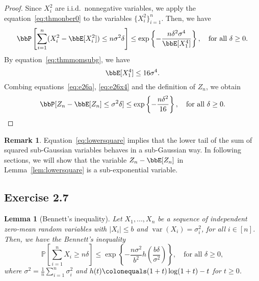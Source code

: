 \documentclass[11pt]{article}
\DeclareMathOperator{\var}{var}
\theoremstyle{plain}
\newtheorem{lem}{Lemma}
\theoremstyle{definition}
\newtheorem{rmk}{Remark}
\begin{document}
\begin{proof}
	Since $X_i^2$ are i.i.d.\ nonnegative variables, we apply the equation~\eqref{eq:thmonber0} to the variables $\{X_i^2\}_{i=1}^n$. Then, we have
	\begin{equation}\label{eq:e26a}
		\bbP\left[\sum_{i=1}^n (X_i^2 -\bbE[X_i^2]) \leq n \sigma^2 \delta\right] \leq \exp\left\{ - \frac{n\delta^2 \sigma^4}{ \bbE[X_1^4]} \right\},  \quad \text{for all }\delta \geq 0.
	\end{equation}
	By equation~\eqref{eq:thmmomsubg}, we have
	\begin{equation}\label{eq:e26x4}
		\bbE[X_1^4] \leq 16 \sigma^4. 
	\end{equation}
	Combing equations~\eqref{eq:e26a}, \eqref{eq:e26x4} and the definition of $Z_n$, we obtain 
	\begin{equation}
		\bbP[Z_n - \bbE[Z_n] \leq \sigma^2 \delta ]  \leq \exp\left\{ - \frac{n\delta^2}{16} \right\},  \quad \text{for all }\delta \geq 0.
	\end{equation}
\end{proof}

\begin{rmk}
	Equation~\eqref{eq:lowersquare} implies that the lower tail of the sum of squared sub-Gaussian variables behaves in a sub-Gaussian way. In following sections, we will show that the variable $Z_n - \bbE[Z_n]$ in Lemma~\ref{lem:lowersquare} is a sub-exponential variable.
\end{rmk}

\subsection{Exercise 2.7}
\begin{lem}[Bennett’s inequality]\label{lem:bennett}
	Let $X_1,...,X_n$ be a sequence of independent zero-mean random variables with $|X_i| \leq b$ and $\var(X_i) = \sigma_i^2$, for all $i \in [n]$. Then, we have the Bennett's inequality
	\begin{equation}\label{eq:bennett}
		\mathbb{P}\left[\sum_{i=1}^{n} X_{i} \geq n \delta\right] \leq \exp \left\{-\frac{n \sigma^{2}}{b^{2}} h\left(\frac{b \delta}{\sigma^{2}}\right)\right\}, \quad \text{for all }\delta \geq 0,
	\end{equation} 
	where $\sigma^2 = \frac{1}{n} \sum_{i=1}^n \sigma_i^2$ and $h(t) \colonequals (1+t)\log (1+t) - t$ for $t \geq 0$.
\end{lem}
\end{document}
